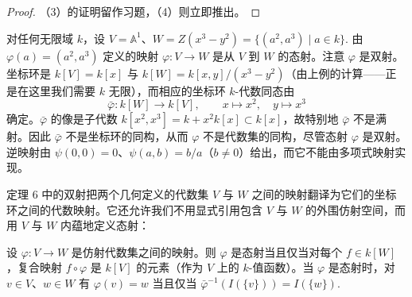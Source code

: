 \begin{proof}
（3）的证明留作习题，（4）则立即推出。
\end{proof}

\begin{example}
对任何无限域 \(k\)，设 \(V = \mathbb{A}^1\)、\(W = Z(x^3-y^2) = \{(a^2,a^3) \mid a \in k\}\). 由 \(\varphi(a) = (a^2,a^3)\) 定义的映射 \(\varphi : V \to W\) 是从 \(V\) 到 \(W\) 的态射。注意 \(\varphi\) 是双射。坐标环是 \(k[V] = k[x]\) 与 \(k[W] = k[x,y]/(x^3-y^2)\)（由上例的计算——正是在这里我们需要 \(k\) 无限），而相应的坐标环 \(k\)-代数同态由
\[
\bar\varphi : k[W] \to k[V], \qquad x \mapsto x^2, \quad y \mapsto x^3
\]
确定。\(\bar\varphi\) 的像是子代数 \(k[x^2, x^3] = k+x^2k[x] \subset k[x]\)，故特别地 \(\bar\varphi\) 不是满射。因此 \(\bar\varphi\) 不是坐标环的同构，从而 \(\varphi\) 不是代数集的同构，尽管态射 \(\varphi\) 是双射。逆映射由 \(\psi(0,0) = 0\)、\(\psi(a,b) = b/a\)（\(b \neq 0\)）给出，而它不能由多项式映射实现。
\end{example}

定理 6 中的双射把两个几何定义的代数集 \(V\) 与 \(W\) 之间的映射翻译为它们的坐标环之间的代数映射。它还允许我们不用显式引用包含 \(V\) 与 \(W\) 的外围仿射空间，而用 \(V\) 与 \(W\) 内蕴地定义态射：

\begin{corollary}\label{cor:15.7}
设 \(\varphi : V \to W\) 是仿射代数集之间的映射。则 \(\varphi\) 是态射当且仅当对每个 \(f \in k[W]\)，复合映射 \(f \circ \varphi\) 是 \(k[V]\) 的元素（作为 \(V\) 上的 \(k\)-值函数）。当 \(\varphi\) 是态射时，对 \(v \in V\)、\(w \in W\) 有 \(\varphi(v) = w\) 当且仅当 \(\bar\varphi^{-1}(I(\{v\})) = I(\{w\})\).
\end{corollary}


